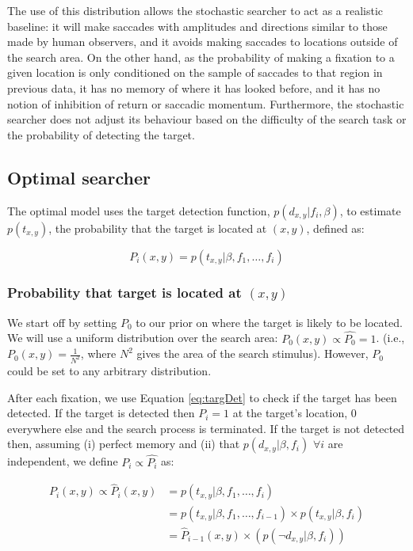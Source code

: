 \documentclass[preprint, authoryear]{elsarticle} %
\begin{document}
The use of this distribution allows the stochastic searcher to act as a realistic baseline: it will make saccades with amplitudes and directions similar to those made by human observers, and it avoids making saccades to locations outside of the search area. On the other hand, as the probability of making a fixation to a given location is only conditioned on the sample of saccades to that region in previous data, it has no memory of where it has looked before, and it has no notion of inhibition of return or saccadic momentum. Furthermore, the stochastic searcher does not adjust its behaviour based on the difficulty of the search task or the probability of detecting the target. 


\subsection{Optimal searcher}

The optimal model uses the target detection function, $p(d_{x,y}|f_i,\beta)$, to estimate $p(t_{x,y})$, the probability that the target is located at $(x,y)$, defined as:

\begin{equation}
P_i(x,y) = p(t_{x,y} | \beta, f_1,\ldots, f_i)
\end{equation}

\subsubsection{Probability that target is located at $(x,y)$}

We start off by setting $P_0$ to our prior on where the target is likely to be located. We will use a uniform distribution over the search area: $P_0(x,y) \propto \hat{P_0}=1$. (i.e.,  $P_0(x,y) = \frac{1}{N^2}$, where $N^2$ gives the area of the search stimulus). However, $P_0$ could be set to any arbitrary distribution. 

After each fixation, we use Equation \ref{eq:targDet} to check if the target has been detected. If the target is detected then $P_i = 1$ at the target's location, 0 everywhere else and the search process is terminated. If the target is not detected then, assuming (i) perfect memory and (ii) that $p(d_{x,y} | \beta, f_i)$ $\forall i$ are independent, we define $P_i\propto \hat{P_i}$ as: 

\begin{align}
P_i(x,y) \propto \hat{P}_i(x,y)	&= p(t_{x,y} | \beta, f_1,\ldots, f_i)\\
 							&= p(t_{x,y} | \beta, f_1,\ldots, f_{i-1})\times p(t_{x,y} | \beta, f_i)\\
 							&= \hat{P}_{i-1}(x,y)\times (p(\neg d_{x,y} | \beta, f_i))
 			\label{eq:Pupdaterule}
\end{align}
\end{document}
